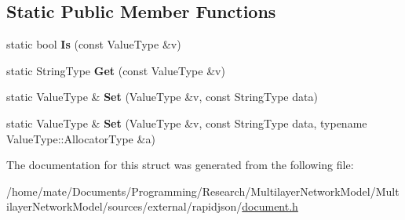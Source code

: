\subsection*{Static Public Member Functions}
\begin{DoxyCompactItemize}
\item 
static bool {\bfseries Is} (const Value\+Type \&v)\hypertarget{structinternal_1_1TypeHelper_3_01ValueType_00_01const_01typename_01ValueType_1_1Ch_01_5_01_4_a9543f180b6ac2b923486f1b69d5356ea}{}\label{structinternal_1_1TypeHelper_3_01ValueType_00_01const_01typename_01ValueType_1_1Ch_01_5_01_4_a9543f180b6ac2b923486f1b69d5356ea}

\item 
static String\+Type {\bfseries Get} (const Value\+Type \&v)\hypertarget{structinternal_1_1TypeHelper_3_01ValueType_00_01const_01typename_01ValueType_1_1Ch_01_5_01_4_a11f8ddfbc91f1d890d63cc67e3f1abb6}{}\label{structinternal_1_1TypeHelper_3_01ValueType_00_01const_01typename_01ValueType_1_1Ch_01_5_01_4_a11f8ddfbc91f1d890d63cc67e3f1abb6}

\item 
static Value\+Type \& {\bfseries Set} (Value\+Type \&v, const String\+Type data)\hypertarget{structinternal_1_1TypeHelper_3_01ValueType_00_01const_01typename_01ValueType_1_1Ch_01_5_01_4_af3a44a3b6f485a71a73af69d30668c8f}{}\label{structinternal_1_1TypeHelper_3_01ValueType_00_01const_01typename_01ValueType_1_1Ch_01_5_01_4_af3a44a3b6f485a71a73af69d30668c8f}

\item 
static Value\+Type \& {\bfseries Set} (Value\+Type \&v, const String\+Type data, typename Value\+Type\+::\+Allocator\+Type \&a)\hypertarget{structinternal_1_1TypeHelper_3_01ValueType_00_01const_01typename_01ValueType_1_1Ch_01_5_01_4_a8588f2ab1d0ffbb4c1810d60a500a8c5}{}\label{structinternal_1_1TypeHelper_3_01ValueType_00_01const_01typename_01ValueType_1_1Ch_01_5_01_4_a8588f2ab1d0ffbb4c1810d60a500a8c5}

\end{DoxyCompactItemize}


The documentation for this struct was generated from the following file\+:\begin{DoxyCompactItemize}
\item 
/home/mate/\+Documents/\+Programming/\+Research/\+Multilayer\+Network\+Model/\+Multilayer\+Network\+Model/sources/external/rapidjson/\hyperlink{document_8h}{document.\+h}\end{DoxyCompactItemize}
